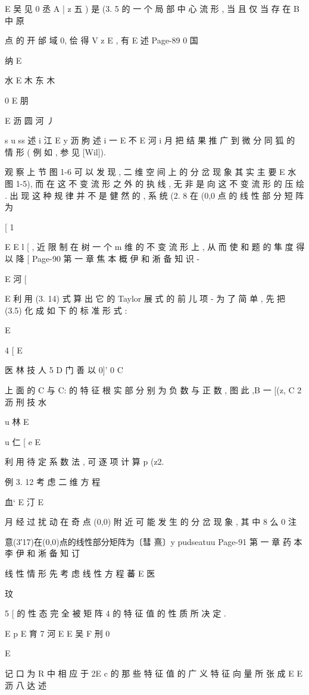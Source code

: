 {{{E 吴 见 0 丞 A
| z 五 )} 是 (3. 5 的 一 个 局 部 中 心 流 形 , 当 且 仅 当 存 在 B 中 原

点 的 开 邰 域 0, 侩 得 V z E , 有
E 述
Page-89
0 国

纳
E

水
E 木 东 木

0
E 朋

E 沥 圆 河 丿

s
u ss 述 i 江
E y 沥 朐 述 i 一
E 不
E 河 i 月
把 结 果 推 广 到 微 分 同 狐 的 情 形 ( 例 如 , 参 见 [Wil]).

观 察 上 节 图 1-6 可 以 发 现 , 二 维 空 间 上 的 分 岔 现 象 其 实 主 要
E 水
图 1-5), 而 在 这 不 变 流 形 之 外 的 执 线 , 无 非 是 向 这 不 变 流 形 的 压
绘 . 出 现 这 种 规 律 并 不 是 健 然 的 , 系 统 (2. 8 在 (0,0 点 的 线 性 部
分 短 阵 为

[
1

E
E l
[
, 近 限 制 在 树 一 个 m 维 的 不 变 流 形 上 , 从 而 使 和 题 的 隼 度 得 以 降
[
Page-90
第 一 章 焦 本 概 伊 和 淅 备 知 识 -

E 河 [

E
利 用 (3. 14) 式 算 出 它 的 Taylor 展 式 的 前 儿 项 -
为 了 简 单 , 先 把 (3.5) 化 成 如 下 的 标 准 形 式 :

E

4 [
E

医 林 技 人 5
D
门 善 以 0]'
0 C

上 面 的 C 与 C: 的 特 征 根 实 部 分 别 为 负 数 与 正 数 , 图 此 ,B 一 [(z,
C 2 沥
刑 技 水

u 林
E

u 仁
[
e
E

利 用 待 定 系 数 法 , 可 逐 项 计 算 p (z2.

例 3. 12 考 虑 二 维 方 程

血`
E 汀
E

月
经 过 扰 动 在 奇 点 (0,0) 附 近 可 能 发 生 的 分 岔 现 象 , 其 中 8 么 0 注

意(3′17)在(0,0)点的线性部分矩阵为〔彗 熹〕y pudseatuu
Page-91
第 一 章 药 本 李 伊 和 淅 备 知 订

线 性 情 形
先 考 虑 线 性 方 程
蕃 E 医

玟

5 [
的 性 态 完 全 被 矩 阵 4 的 特 征 值 的 性 质 所 决 定 .

E p
E 育 7 河
E
E 吴 F 刑
0

E

记 口 为 R 中 相 应 于 2E c 的 那 些 特 征 值 的 广 义 特 征 向 量 所 张 成
E
E 沥 八 达 述

}}
